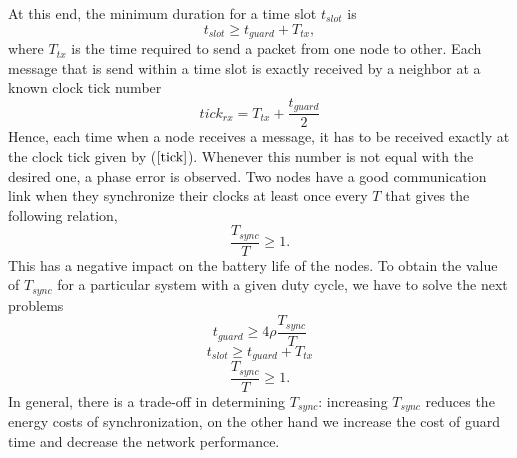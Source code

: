 \documentclass[journal]{IEEEtran}
\begin{document}
At this end, the minimum duration for a time slot $t_{slot}$ is
\begin{equation}
t_{slot} \geq t_{guard} + T_{tx},
\end{equation}
where $T_{tx}$ is the time required to send a packet from one node to other. \newline Each message
that is send within a time slot is exactly received by a neighbor at
a known clock tick number
\begin{equation}
tick_{rx} = T_{tx}+ \frac{t_{guard}}{2} \label{tick}
\end{equation}
Hence, each time when a node receives a message, it has to be
received exactly at the clock tick given by ($\ref{tick}$). Whenever
this number is not equal with the desired one, a phase error is observed. 
\newline Two nodes have a good communication link when they synchronize
their clocks at least once every $T$ that gives the following
relation,
\begin{equation}
\frac{T_{sync}}{T}\geq 1.
\end{equation}
This has a negative impact on the battery life of the nodes. To obtain the value of
$T_{sync}$ for a particular system with a given duty cycle, we have
to solve the next problems
\begin{equation}
t_{guard} \geq 4\rho \frac{T_{sync}}{T}
\end{equation}
\begin{equation}
t_{slot} \geq t_{guard} + T_{tx}
\end{equation}
\begin{equation}
\frac{T_{sync}}{T} \geq 1.
\end{equation}
In general, there is a trade-off in determining $T_{sync}$: increasing
$T_{sync}$ reduces the energy costs of synchronization, on the other
hand we increase the cost of guard time and decrease the network
performance.
\end{document}
